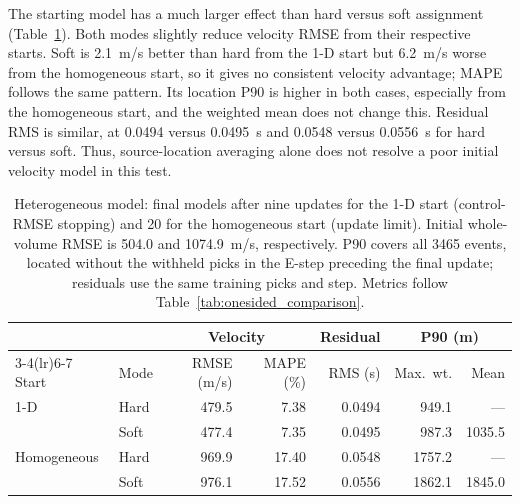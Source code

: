 The starting model has a much larger effect than hard versus soft assignment (Table~\ref{tab:heterogeneous_comparison}). Both modes slightly reduce velocity RMSE from their respective starts. Soft is 2.1~m/s better than hard from the 1-D start but 6.2~m/s worse from the homogeneous start, so it gives no consistent velocity advantage; MAPE follows the same pattern. Its location P90 is higher in both cases, especially from the homogeneous start, and the weighted mean does not change this. Residual RMS is similar, at 0.0494 versus 0.0495~s and 0.0548 versus 0.0556~s for hard versus soft. Thus, source-location averaging alone does not resolve a poor initial velocity model in this test.

\begin{table}[!htb]
\centering
\begin{singlespace}
\small
\setlength{\tabcolsep}{3.5pt}
\caption{Heterogeneous model: final models after nine updates for the 1-D start (control-RMSE stopping) and 20 for the homogeneous start (update limit). Initial whole-volume RMSE is 504.0 and 1074.9~m/s, respectively. P90 covers all 3465 events, located without the withheld picks in the E-step preceding the final update; residuals use the same training picks and step. Metrics follow Table~\ref{tab:onesided_comparison}.}
\label{tab:heterogeneous_comparison}
\smallskip
\begin{tabular}{llrrrrr}
\toprule
& & \multicolumn{2}{c}{Velocity} & Residual & \multicolumn{2}{c}{P90 (m)} \\
\cmidrule(lr){3-4}\cmidrule(lr){6-7}
Start & Mode & RMSE (m/s) & MAPE (\%) & RMS (s) & Max.\ wt. & Mean \\
\midrule
1-D & Hard & 479.5 & 7.38 & 0.0494 & 949.1 & --- \\
 & Soft & 477.4 & 7.35 & 0.0495 & 987.3 & 1035.5 \\
\addlinespace
Homogeneous & Hard & 969.9 & 17.40 & 0.0548 & 1757.2 & --- \\
 & Soft & 976.1 & 17.52 & 0.0556 & 1862.1 & 1845.0 \\
\bottomrule
\end{tabular}
\end{singlespace}
\end{table}
